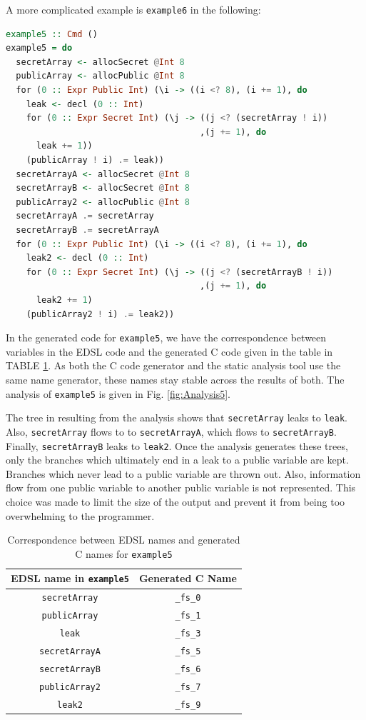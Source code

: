 \documentclass[10pt, conference]{IEEEtran}
\newcommand{\ttt}{\texttt}
\begin{document}
A more complicated example is \ttt{example6} in the following:

\begin{lstlisting}[language=Haskell]
example5 :: Cmd ()
example5 = do
  secretArray <- allocSecret @Int 8
  publicArray <- allocPublic @Int 8
  for (0 :: Expr Public Int) (\i -> ((i <? 8), (i += 1), do
    leak <- decl (0 :: Int)
    for (0 :: Expr Secret Int) (\j -> ((j <? (secretArray ! i))
                                      ,(j += 1), do
      leak += 1))
    (publicArray ! i) .= leak))
  secretArrayA <- allocSecret @Int 8
  secretArrayB <- allocSecret @Int 8
  publicArray2 <- allocPublic @Int 8
  secretArrayA .= secretArray
  secretArrayB .= secretArrayA
  for (0 :: Expr Public Int) (\i -> ((i <? 8), (i += 1), do
    leak2 <- decl (0 :: Int)
    for (0 :: Expr Secret Int) (\j -> ((j <? (secretArrayB ! i))
                                      ,(j += 1), do
      leak2 += 1)
    (publicArray2 ! i) .= leak2))
\end{lstlisting}

In the generated code for \ttt{example5}, we have the correspondence between variables in the EDSL code and the
generated C code given in the table in TABLE \ref{table:Names5}. As both the C code generator and the
static analysis tool use the same name generator, these names stay stable across the results of both. The analysis of \ttt{example5} is given in Fig. \ref{fig:Analysis5}.

The tree in resulting from the analysis shows that \ttt{secretArray} leaks to \ttt{leak}. Also, \ttt{secretArray} flows to
to \ttt{secretArrayA}, which flows to \ttt{secretArrayB}. Finally, \ttt{secretArrayB} leaks to \ttt{leak2}. Once
the analysis generates these trees, only the branches which ultimately end in a leak to a public variable
are kept. Branches which never lead to a public variable are thrown out. Also, information flow from one
public variable to another public variable is not represented. This choice was made to limit the size
of the output and prevent it from being too overwhelming to the programmer.

\begin{table}
  \centering
  \begin{tabular}{|c|c|}
    \hline
    EDSL name in \ttt{example5} & Generated C Name \\
    \hline
    \verb|secretArray| & \verb|_fs_0|\\
    \hline
    \verb|publicArray| & \verb|_fs_1|\\
    \hline
    \verb|leak| & \verb|_fs_3|\\
    \hline
    \verb|secretArrayA| & \verb|_fs_5|\\
    \hline
    \verb|secretArrayB| & \verb|_fs_6|\\
    \hline
    \verb|publicArray2| & \verb|_fs_7|\\
    \hline
    \verb|leak2| & \verb|_fs_9|\\
    \hline
  \end{tabular}
\caption{Correspondence between EDSL names and generated C names for \ttt{example5}}
\label{table:Names5}
\end{table}
\end{document}

